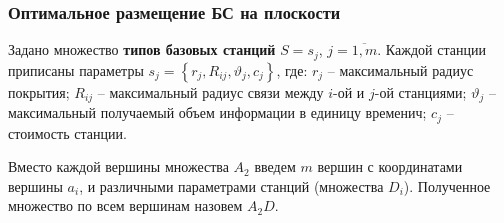 \begin{frame}
    \frametitle{Оптимальное размещение БС на плоскости}
    \justifying
    Задано множество \textbf{типов базовых станций} $S = s_j$, $j=\overline{1,m}$. Каждой станции приписаны параметры $s_j = \left\{r_j, R_{ij}, \vartheta_j, c_j \right\}$, где:
    $r_j$ -- максимальный радиус покрытия; $R_{ij}$ -- максимальный радиус связи между $i$-ой и $j$-ой станциями; $\vartheta_j$ -- максимальный получаемый объем информации в единицу временич; $c_j$ -- стоимость станции.
    
    \bigskip


    Вместо каждой вершины множества $A_2$ введем $m$ вершин с координатами вершины $a_i$, и различными параметрами станций (множества $D_i$). Полученное множество по всем вершинам назовем $A_2D$.
    \bigskip

\end{frame}

